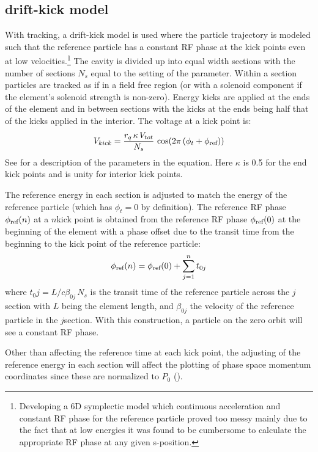 \subsection{drift-kick model}

With  tracking, a drift-kick model is used where the particle trajectory is modeled
such that the reference particle has a constant RF phase at the kick points even at low
velocities.\footnote
  {
Developing a 6D symplectic model which continuous acceleration and constant RF phase for the
reference particle proved too messy mainly due to the fact that at low energies it was found to
be cumbersome to calculate the appropriate RF phase at any given s-position.
  }
The cavity is divided up into equal width sections with the number of sections $N_s$ equal to the
setting of the  parameter. Within a section particles are tracked as if in a field
free region (or with a solenoid component if the element's solenoid strength is non-zero). Energy
kicks are applied at the ends of the element and in between sections with the kicks at the ends
being half that of the kicks applied in the interior. The voltage at a kick point is:
\begin{equation}
  V_{kick} = \frac{r_q \, \kappa \, V_{tot}}{N_s} \, \cos(2 \pi \, (\phi_t + \phi_{\text{ref}}))
\end{equation}
See  for a description of the parameters in the equation. Here $\kappa$ is 0.5 for the end
kick points and is unity for interior kick points.

The reference energy in each section is adjusted to match the energy of the reference particle
(which has $\phi_t = 0$ by definition).  The reference RF phase $\phi_{\text{ref}}(n)$ at a $n$\Th kick
point is obtained from the reference RF phase $\phi_{\text{ref}}(0)$ at the beginning of the element with a
phase offset due to the transit time from the beginning to the kick point of the reference particle:
\begin{equation}
  \phi_{\text{ref}}(n) = \phi_{\text{ref}}(0) + \sum_{j = 1}^n t_{0j}
\end{equation}
where $t_0j = L / c \beta_{0j} \, N_s$ is the transit time of the reference particle across the
$j$\Th section with $L$ being the element length, and $\beta_{0j}$ the velocity of the reference
particle in the $j$\Th section. With this construction, a particle on the zero orbit will see a
constant RF phase.

Other than affecting the reference time at each kick point, the adjusting of the reference energy
in each section will affect the plotting of phase space momentum coordinates since these
are normalized to $P_0$ ().

